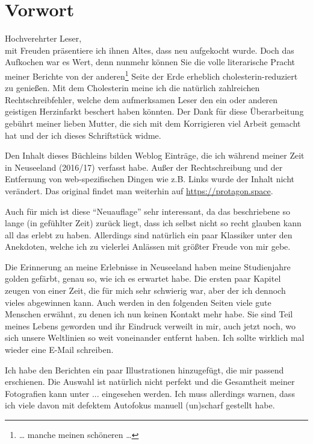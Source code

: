 \chapter*{Vorwort}

Hochverehrter Leser,\\
mit Freuden präsentiere ich ihnen Altes, dass neu aufgekocht wurde.
Doch das Aufkochen war es Wert, denn nunmehr können Sie die volle
literarische Pracht meiner Berichte von der anderen\footnote{\ldots{}
  manche meinen schöneren \ldots{}} Seite der Erde erheblich
cholesterin-reduziert zu genießen. Mit dem Cholesterin meine ich die
natürlich zahlreichen Rechtschreibfehler, welche dem aufmerksamen
Leser den ein oder anderen geistigen Herzinfarkt beschert haben
könnten. Der Dank für diese Überarbeitung gebührt meiner lieben
Mutter, die sich mit dem Korrigieren viel Arbeit gemacht hat und der
ich dieses Schriftstück widme.

Den Inhalt dieses Büchleins bilden Weblog Einträge, die ich während
meiner Zeit in Neuseeland (2016/17) verfasst habe. Außer der
Rechtschreibung und der Entfernung von web-spezifischen Dingen wie
z.B. Links wurde der Inhalt nicht verändert. Das original findet man
weiterhin auf \url{https://protagon.space}.


Auch für mich ist diese ``Neuauflage'' sehr interessant, da das
beschriebene so lange (in gefühlter Zeit) zurück liegt, dass ich
selbst nicht so recht glauben kann all das erlebt zu haben. Allerdings
sind natürlich ein paar Klassiker unter den Anekdoten, welche ich zu
vielerlei Anlässen mit größter Freude von mir gebe.

Die Erinnerung an meine Erlebnisse in Neuseeland haben meine
Studienjahre golden gefärbt, genau so, wie ich es erwartet habe. Die
ersten paar Kapitel zeugen von einer Zeit, die für mich sehr schwierig
war, aber der ich dennoch vieles abgewinnen kann.  Auch werden in den
folgenden Seiten viele gute Menschen erwähnt, zu denen ich nun keinen
Kontakt mehr habe. Sie sind Teil meines Lebens geworden und ihr
Eindruck verweilt in mir, auch jetzt noch, wo sich unsere Weltlinien
so weit voneinander entfernt haben. Ich sollte wirklich mal wieder
eine E-Mail schreiben.

Ich habe den Berichten ein paar Illustrationen hinzugefügt, die mir
passend erschienen. Die Auswahl ist natürlich nicht perfekt und die
Gesamtheit meiner Fotografien kann unter ... eingesehen werden.
Ich muss allerdings warnen, dass ich viele davon mit defektem
Autofokus manuell (un)scharf gestellt habe.


